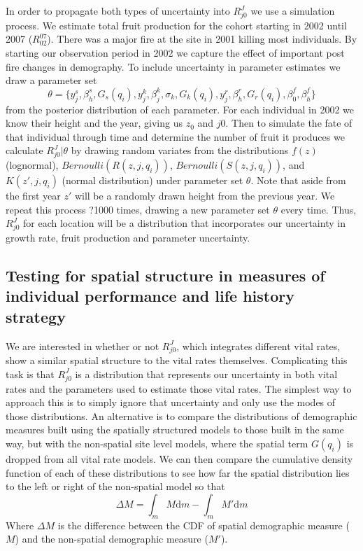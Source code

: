 \documentclass[12pt,a4paper]{article}
\begin{document}
In order to propagate both types of uncertainty into $R_{j0}^J$ we use a simulation process. We estimate total fruit production for the cohort starting in 2002 until 2007 ($R_{02}^{07}$). There was a major fire at the site in 2001 killing most individuals. By starting our observation period in 2002 we capture the effect of important post fire changes in demography. To include uncertainty in parameter estimates we draw a parameter set 
\begin{equation}
	\theta = \{ y_j^s, \beta_h^s, G_s(q_i), y_j^k, \beta_j^k, \sigma_k, G_k(q_i),  y_j^r, \beta_h^r, G_r(q_i), \beta_0^f, \beta_h^f \}
\end{equation}  
from the posterior distribution of each parameter. For each individual in 2002 we know their height and the year, giving us $z_0$ and $j0$. Then to simulate the fate of that individual through time and determine the number of fruit it produces we calculate $R_{j0}^J | \theta$ by drawing random variates from the distributions $f(z)$ (lognormal), $Bernoulli(R(z, j, q_i))$, $Bernoulli(S(z, j, q_i))$, and $K(z', j, q_i)$ (normal distribution) under parameter set $\theta$. Note that aside from the first year $z'$ will be a randomly drawn height from the previous year. We repeat this process ?1000 times, drawing a new parameter set $\theta$ every time. Thus, $R_{j0}^J$ for each location will be a distribution that incorporates our uncertainty in growth rate, fruit production and parameter uncertainty.                        

\subsection*{Testing for spatial structure in measures of individual performance and life history strategy}
We are interested in whether or not $R_{j0}^J$, which integrates different vital rates, show a similar spatial structure to the vital rates themselves. Complicating this task is that $R_{j0}^J$ is a distribution that represents our uncertainty in both vital rates and the parameters used to estimate those vital rates. The simplest way to approach this is to simply ignore that uncertainty and only use the modes of those distributions. An alternative is to compare the distributions of demographic measures built using the spatially structured models to those built in the same way, but with the non-spatial site level models, where the spatial term $G(q_i)$ is dropped from all vital rate models. We can then compare the cumulative density function of each of these distributions to see how far the spatial distribution lies to the left or right of the non-spatial model so that 
\begin{equation}
	\Delta M = \int_m M \text{d}m - \int_m M' \text{d}m
\end{equation}              
Where $\Delta M$ is the difference between the CDF of spatial demographic measure ($M$) and the non-spatial demographic measure ($M'$). 
\end{document}
